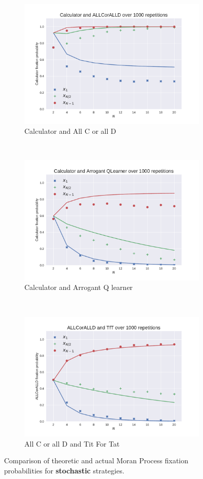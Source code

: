 \documentclass{article}
\begin{document}
\begin{figure}[!hbtp]
    \begin{subfigure}[t]{.3\textwidth}
        \centering
        \includegraphics[width=.8\textwidth]{./img/Calculator_v_ALLCorALLD.pdf}
        \caption{Calculator and All C or all D}
    \end{subfigure}%
    ~
    \begin{subfigure}[t]{.3\textwidth}
        \centering
        \includegraphics[width=.8\textwidth]{./img/Calculator_v_Arrogant_QLearner.pdf}
        \caption{Calculator and Arrogant Q learner}
    \end{subfigure}%
    ~
    \begin{subfigure}[t]{.3\textwidth}
        \centering
        \includegraphics[width=.8\textwidth]{./img/ALLCorALLD_v_TfT.pdf}
        \caption{All C or all D and Tit For Tat}
    \end{subfigure}%
    \caption{Comparison of theoretic and actual Moran Process
             fixation probabilities for \textbf{stochastic} strategies.}
    \label{fig:comparison_stochastic}
\end{figure}
\end{document}
